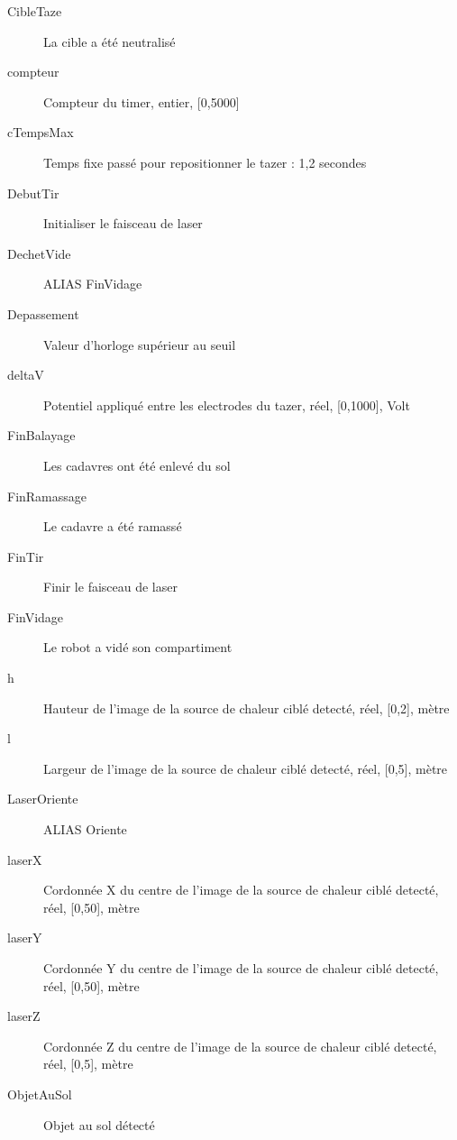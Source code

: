 \begin{description}
	\item [CibleTaze]\el
	La cible a été neutralisé

	\item [compteur]\el
	Compteur du timer, entier, [0,5000]

	\item [cTempsMax]\el
	Temps fixe passé pour repositionner le tazer : 1,2 secondes

	\item [DebutTir]\el
	Initialiser le faisceau de laser

	\item [DechetVide]\el
	ALIAS FinVidage

	\item [Depassement]\el
	Valeur d'horloge supérieur au seuil

	\item [deltaV]\el
	Potentiel appliqué entre les electrodes du tazer, réel, [0,1000], Volt

	\item [FinBalayage]\el
	Les cadavres ont été enlevé du sol

	\item [FinRamassage]\el
	Le cadavre a été ramassé

	\item [FinTir]\el
	Finir le faisceau de laser

	\item [FinVidage]\el
	Le robot a vidé son compartiment

	\item [h]\el
	Hauteur de l'image de la source de chaleur ciblé detecté, réel, [0,2], mètre

	\item [l]\el
	Largeur de l'image de la source de chaleur ciblé detecté, réel, [0,5], mètre

	\item [LaserOriente]\el
	ALIAS Oriente

	\item [laserX]\el
	Cordonnée X du centre de l'image de la source de chaleur ciblé detecté, réel, [0,50], mètre

	\item [laserY]\el
	Cordonnée Y du centre de l'image de la source de chaleur ciblé detecté, réel, [0,50], mètre

	\item [laserZ]\el
	Cordonnée Z du centre de l'image de la source de chaleur ciblé detecté, réel, [0,5], mètre

	\item [ObjetAuSol]\el
	Objet au sol détecté


\end{description}
